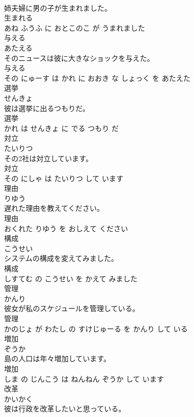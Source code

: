 \documentclass[8pt]{extreport}
\begin{document}
\begin{CJK}{UTF8}{min}
\\	姉夫婦に男の子が生まれました。	
\\	生まれる 
\\	あね ふうふ に おとこのこ が うまれました			
\\	与える	
\\	あたえる			
\\	そのニュースは彼に大きなショックを与えた。	
\\	与える 
\\	その にゅーす は かれ に おおき な しょっく を あたえた			
\\	選挙	
\\	せんきょ			
\\	彼は選挙に出るつもりだ。	
\\	選挙 
\\	かれ は せんきょ に でる つもり だ			
\\	対立	
\\	たいりつ			
\\	その2社は対立しています。	
\\	対立 
\\	その にしゃ は たいりつ して います			
\\	理由	
\\	りゆう			
\\	遅れた理由を教えてください。	
\\	理由 
\\	おくれた りゆう を おしえて ください			
\\	構成	
\\	こうせい			
\\	システムの構成を変えてみました。	
\\	構成 
\\	しすてむ の こうせい を かえて みました			
\\	管理	
\\	かんり			
\\	彼女が私のスケジュールを管理している。	
\\	管理 
\\	かのじょ が わたし の すけじゅーる を かんり して いる			
\\	増加	
\\	ぞうか			
\\	島の人口は年々増加しています。	
\\	増加 
\\	しま の じんこう は ねんねん ぞうか して います			
\\	改革	
\\	かいかく			
\\	彼は行政を改革したいと思っている。	

\end{CJK}
\end{document}
